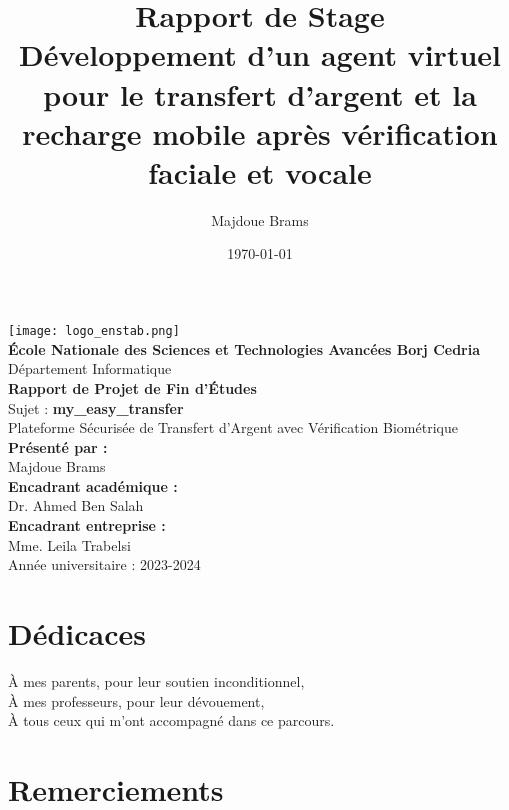 \documentclass[12pt,a4paper]{report}
\title{Rapport de Stage\\Développement d'un agent virtuel pour le transfert d'argent et la recharge mobile après vérification faciale et vocale}
\author{Majdoue Brams}
\date{\today}
\begin{document}
\maketitle

\tableofcontents

\begin{titlepage}
    \begin{center}
        \texttt{[image: logo\_enstab.png]}~\\[1cm]
        {\LARGE \textbf{École Nationale des Sciences et Technologies Avancées Borj Cedria}}\\[0.5cm]
        {\large Département Informatique}\\[2cm]
        {\Huge \textbf{Rapport de Projet de Fin d'Études}}\\[1cm]
        {\Large Sujet : \textbf{my_easy_transfer}}\\[0.5cm]
        {\large Plateforme Sécurisée de Transfert d'Argent avec Vérification Biométrique}\\[2cm]
        \textbf{Présenté par :}\\
        Majdoue Brams\\[0.5cm]
        \textbf{Encadrant académique :}\\
        Dr. Ahmed Ben Salah\\[0.5cm]
        \textbf{Encadrant entreprise :}\\
        Mme. Leila Trabelsi\\[2cm]
        Année universitaire : 2023-2024
    \end{center}
\end{titlepage}

\chapter*{Dédicaces}
À mes parents, pour leur soutien inconditionnel,\\
À mes professeurs, pour leur dévouement,\\
À tous ceux qui m'ont accompagné dans ce parcours.\\
\newpage

\chapter*{Remerciements}
\lipsum[1-2]

\end{document}
